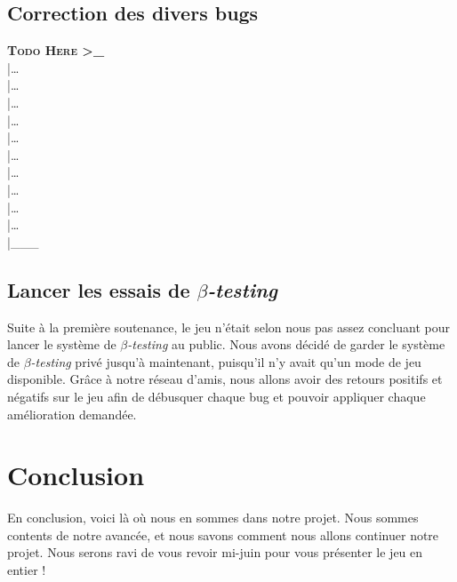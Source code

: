 \documentclass[12pt,a4paper]{article}
\begin{document}
        \subsection{Correction des divers bugs}
            \textbf{\textsc{Todo Here >\_}}\\
            |\dots\\|\dots\\|\dots\\|\dots\\|\dots\\|\dots\\|\dots\\|\dots\\|\dots\\|\dots\\|\_\_\_\\
            
        \subsection{Lancer les essais de \(\beta\)\textsl{-testing}}
            Suite à la première soutenance, le jeu n'était selon nous pas assez concluant
            pour lancer le système de \(\beta\)\textsl{-testing} au public. Nous avons
            décidé de garder le système de \(\beta\)\textsl{-testing} privé jusqu'à maintenant,
            puisqu'il n'y avait qu'un mode de jeu disponible. Grâce à notre réseau d'amis, 
            nous allons avoir des retours positifs et négatifs sur le jeu afin de débusquer
            chaque bug et pouvoir appliquer chaque amélioration demandée.


    \section*{Conclusion}
        En conclusion, voici là où nous en sommes dans notre projet.
        Nous sommes contents de notre avancée, et nous savons comment
        nous allons continuer notre projet. 
        Nous serons ravi de vous revoir mi-juin pour vous présenter le jeu en entier !
\end{document}
